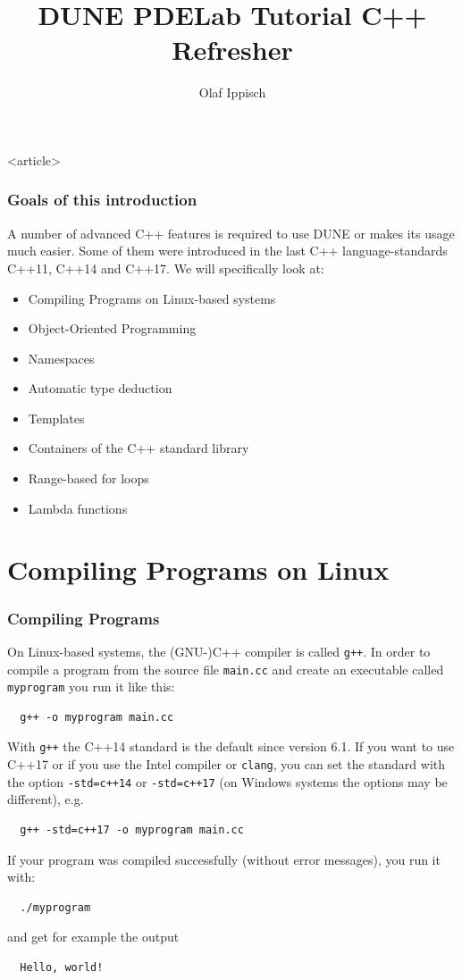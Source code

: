 \documentclass[aspectratio=169,ignorenonframetext,11pt]{beamer}
\title{DUNE PDELab Tutorial C++ Refresher}
\author{Olaf Ippisch}
\institute[]
{
  Institut für Mathematik\\TU Clausthal
}
\def\inline{\lstinline[basicstyle=\small\ttfamily]}
\begin{document}
\begin{onlyenv}<article>
\maketitle
\end{onlyenv}



\begin{frame}
  \frametitle{Goals of this introduction}
  A number of advanced C++ features is required to use DUNE or makes
  its usage much easier. Some of them were introduced in the last
  C++ language-standards  C++11, C++14 and C++17. We will specifically look at:
  \begin{itemize}
  \item Compiling Programs on Linux-based systems
  \item Object-Oriented Programming
  \item Namespaces
  \item Automatic type deduction
  \item Templates
  \item Containers of the C++ standard library
  \item Range-based for loops
  \item Lambda functions
  \end{itemize}
\end{frame}

\section{Compiling Programs on Linux}
\begin{frame}[fragile]
  \frametitle<presentation>{Compiling Programs}
  On Linux-based systems, the (GNU-)C++ compiler is called \inline!g++!. In order to compile a program from the source file \inline!main.cc! and create an executable called \inline!myprogram! you run it like this:
  \begin{lstlisting}
  g++ -o myprogram main.cc
  \end{lstlisting}
With \lstinline!g++! the C++14 standard is the default since version 6.1. If you want to use C++17 or if you use the Intel compiler or \lstinline!clang!, you can set the standard with the option \lstinline!-std=c++14! or \lstinline!-std=c++17! (on Windows systems the options may be different), e.g.
  \begin{lstlisting}
  g++ -std=c++17 -o myprogram main.cc
  \end{lstlisting}

If your program was compiled successfully (without error messages), you run it with:
  \begin{lstlisting}
  ./myprogram
  \end{lstlisting}
and get for example the output
  \begin{lstlisting}
  Hello, world!
  \end{lstlisting}
\end{frame}
\end{document}
